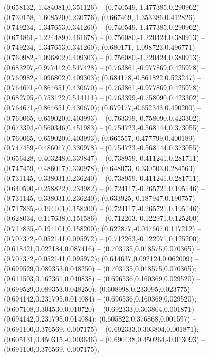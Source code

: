  (0.658132,-1.484081,0.351126) -- (0.740549,-1.477385,0.290962) -- (0.730158,-1.608520,0.230776);
 (0.667469,-1.353386,0.412826) -- (0.749234,-1.347653,0.341260) -- (0.740549,-1.477385,0.290962);
 (0.674861,-1.224489,0.461678) -- (0.756080,-1.220424,0.380913) -- (0.749234,-1.347653,0.341260);
 (0.680171,-1.098723,0.496771) -- (0.760982,-1.096802,0.409303) -- (0.756080,-1.220424,0.380913);
 (0.683297,-0.977412,0.517428) -- (0.763861,-0.977869,0.425978) -- (0.760982,-1.096802,0.409303);
 (0.684178,-0.861822,0.523247) -- (0.764671,-0.864651,0.430670) -- (0.763861,-0.977869,0.425978);
 (0.682795,-0.753122,0.514111) -- (0.763399,-0.758090,0.423302) -- (0.764671,-0.864651,0.430670);
 (0.679177,-0.652343,0.490200) -- (0.760065,-0.659020,0.403993) -- (0.763399,-0.758090,0.423302);
 (0.673394,-0.560346,0.451983) -- (0.754723,-0.568144,0.373055) -- (0.760065,-0.659020,0.403993);
 (0.665557,-0.477799,0.400189) -- (0.747459,-0.486017,0.330978) -- (0.754723,-0.568144,0.373055);
 (0.656428,-0.403248,0.339847) -- (0.738959,-0.411241,0.281711) -- (0.747459,-0.486017,0.330978);
 (0.648073,-0.330503,0.284563) -- (0.731145,-0.338031,0.236240) -- (0.738959,-0.411241,0.281711);
 (0.640590,-0.258822,0.234982) -- (0.724117,-0.265721,0.195146) -- (0.731145,-0.338031,0.236240);
 (0.633925,-0.187947,0.190757) -- (0.717835,-0.194101,0.158200) -- (0.724117,-0.265721,0.195146);
 (0.628034,-0.117638,0.151586) -- (0.712263,-0.122971,0.125200) -- (0.717835,-0.194101,0.158200);
 (0.622877,-0.047667,0.117212) -- (0.707372,-0.052141,0.095972) -- (0.712263,-0.122971,0.125200);
 (0.618421,0.022184,0.087416) -- (0.703135,0.018575,0.070365) -- (0.707372,-0.052141,0.095972);
 (0.614637,0.092124,0.062009) -- (0.699529,0.089353,0.048250) -- (0.703135,0.018575,0.070365);
 (0.611503,0.162361,0.040838) -- (0.696536,0.160369,0.029520) -- (0.699529,0.089353,0.048250);
 (0.608998,0.233095,0.023775) -- (0.694142,0.231795,0.014084) -- (0.696536,0.160369,0.029520);
 (0.607108,0.304530,0.010720) -- (0.692333,0.303804,0.001871) -- (0.694142,0.231795,0.014084);
 (0.605822,0.376868,0.001597) -- (0.691100,0.376569,-0.007175) -- (0.692333,0.303804,0.001871);
 (0.605131,0.450315,-0.003646) -- (0.690438,0.450264,-0.013093) -- (0.691100,0.376569,-0.007175);
